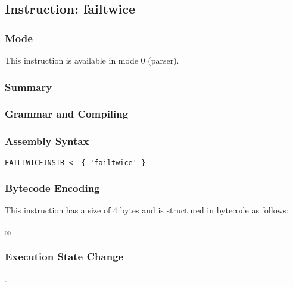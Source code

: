 \subsection{Instruction: failtwice}

\subsubsection{Mode}
This instruction is available in mode 0 (parser).
\subsubsection{Summary}


\subsubsection{Grammar and Compiling}


\subsubsection{Assembly Syntax}

\begin{myquote}
\begin{verbatim}
FAILTWICEINSTR <- { 'failtwice' }
\end{verbatim}
\end{myquote}

\subsubsection{Bytecode Encoding}

This instruction has a size of 4 bytes and is structured in bytecode as follows:

$_{00}$\ 

\subsubsection{Execution State Change}

.


